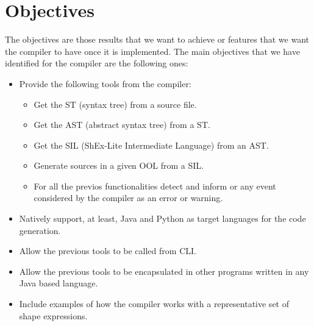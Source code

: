 \section{Objectives}

The objectives are those results that we want to achieve or features that we want the compiler to have once it is implemented. The main objectives that we have identified for the compiler are the following ones:
\begin{itemize}
    \item Provide the following tools from the compiler:
    \begin{itemize}
        \item Get the ST (syntax tree) from a source file.
        \item Get the AST (abstract syntax tree) from a ST.
        \item Get the SIL (ShEx-Lite Intermediate Language) from an AST.
        \item Generate sources in a given OOL from a SIL.
        \item For all the previos functionalities detect and inform or any event considered by the compiler as an error or warning.
    \end{itemize}
    \item Natively support, at least, Java and Python as target languages for the code generation.
    \item Allow the previous tools to be called from CLI.
    \item Allow the previous tools to be encapsulated in other programs written in any Java based language.
    \item Include examples of how the compiler works with a representative set of shape expressions.
\end{itemize}